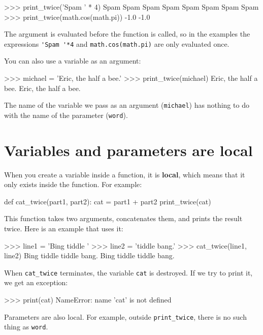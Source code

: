 
\beforeverb
\begin{pyinterpreter}
>>> print_twice('Spam ' * 4)
Spam Spam Spam Spam
Spam Spam Spam Spam
>>> print_twice(math.cos(math.pi))
-1.0
-1.0
\end{pyinterpreter}
\afterverb
%
The argument is evaluated before the function is called, so
in the examples the expressions \verb"'Spam '*4" and
{\tt math.cos(math.pi)} are only evaluated once.


You can also use a variable as an argument:

\beforeverb
\begin{pyinterpreter}
>>> michael = 'Eric, the half a bee.'
>>> print_twice(michael)
Eric, the half a bee.
Eric, the half a bee.
\end{pyinterpreter}
\afterverb
%
The name of the variable we pass as an argument ({\tt michael}) has
nothing to do with the name of the parameter ({\tt word}).  


\section{Variables and parameters are local}

When you create a variable inside a function, it is {\bf local},
which means that it only
exists inside the function.  For example:


\beforeverb
\begin{pycode}
def cat_twice(part1, part2):
    cat = part1 + part2
    print_twice(cat)
\end{pycode}
\afterverb
%
This function takes two arguments, concatenates them, and prints
the result twice.  Here is an example that uses it:


\beforeverb
\begin{pyinterpreter}
>>> line1 = 'Bing tiddle '
>>> line2 = 'tiddle bang.'
>>> cat_twice(line1, line2)
Bing tiddle tiddle bang.
Bing tiddle tiddle bang.
\end{pyinterpreter}
\afterverb
%
When \verb"cat_twice" terminates, the variable {\tt cat}
is destroyed.  If we try to print it, we get an exception:


\beforeverb
\begin{pyinterpreter}
>>> print(cat)
NameError: name 'cat' is not defined
\end{pyinterpreter}
\afterverb
%
Parameters are also local.
For example, outside \verb"print_twice", there is no
such thing as {\tt word}.

